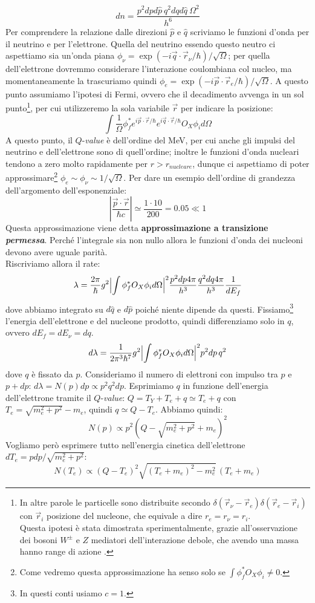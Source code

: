 $$dn = \frac{p^2 dp d\hat{p}\:q^2dqd\hat{q}\:\Omega^2}{h^6}$$
Per comprendere la relazione dalle direzioni $\hat{p}$ e $\hat{q}$ scriviamo le funzioni d'onda per il neutrino e per l'elettrone. Quella del neutrino essendo questo neutro ci aspettiamo sia un'onda piana $\phi_\nu = \exp{(-i\vec{q}\cdot\vec{r}_\nu/\hbar)}/\sqrt{\Omega}$; per quella dell'elettrone dovremmo considerare l'interazione coulombiana col nucleo, ma momentaneamente la trascuriamo quindi $\phi_e = \exp{(-i\vec{p}\cdot\vec{r}_e/\hbar)}/\sqrt{\Omega}$. A questo punto assumiamo l'ipotesi di Fermi, ovvero che il decadimento avvenga in un sol punto\footnote{In altre parole le particelle sono distribuite secondo $\delta(\vec{r}_\nu - \vec{r}_e)\delta(\vec{r}_e-\vec{r}_i)$ con $\vec{r}_i$ posizione del nucleone, che equivale a dire $r_e=r_\nu=r_i$.\\ 
Questa ipotesi è stata dimostrata sperimentalmente, grazie all'osservazione dei bosoni $W^\pm$ e $Z$ mediatori dell'interazione debole, che avendo una massa  hanno range di azione .}, per cui utilizzeremo la sola variabile $\vec{r}$ per indicare la posizione: 
$$\int \frac{1}{\Omega} \phi^*_f e^{i\vec{p}\cdot\vec{r}/\hbar} e^{i\vec{q}\cdot\vec{r}/\hbar} O_X \phi_i d\Omega$$
A questo punto, il $Q$-\textit{value} è dell'ordine del MeV, per cui anche gli impulsi del neutrino e dell'elettrone sono di quell'ordine; inoltre le funzioni d'onda nucleari tendono a zero molto rapidamente per $r>r_{nucleare}$, dunque ci aspettiamo di poter approssimare\footnote{Come vedremo questa approssimazione ha senso solo se $\int \phi^*_f O_X \phi_i \not = 0$.} $\phi_e\sim\phi_\nu\sim 1/\sqrt{\Omega}$. Per dare un esempio dell'ordine di grandezza dell'argomento dell'esponenziale:
$$|\frac{\vec{p}\cdot\vec{r}}{\hbar c}|\simeq \frac{1\cdot10}{200}=0.05\ll 1$$
Questa approssimazione viene detta \textbf{approssimazione a transizione \textit{permessa}}. Perché l'integrale sia non nullo allora le funzioni d'onda dei nucleoni devono avere uguale parità.\\
Riscriviamo allora il rate:
$$\lambda = \frac{2\pi}{\hbar}g^2 \Bigl |\int \phi_f^* O_X \phi_i d\Omega\Bigr |^2 \frac{p^2 dp 4\pi}{h^3}\frac{q^2dq4\pi}{h^3}\frac{1}{dE_f}$$
dove abbiamo integrato su $d\hat{q}$ e $d\hat{p}$ poiché niente dipende da questi. Fissiamo\footnote{In questi conti usiamo $c=1$.} l'energia dell'elettrone e del nucleone prodotto, quindi differenziamo solo in $q$, ovvero $dE_f = dE_\nu = dq$.
$$d\lambda = \frac{1}{2\pi^3 \hbar^7}g^2 \Bigl |\int \phi_f^* O_X \phi_i d\Omega\Bigr |^2 p^2 dp\, q^2 $$
dove $q$ è fissato da $p$. Consideriamo il numero di elettroni con impulso tra $p$ e $p+dp$: $d\lambda = N(p)dp \propto p^2 q^2 dp$. Esprimiamo $q$ in funzione dell'energia dell'elettrone tramite il $Q$-\textit{value}: $Q = T_Y + T_e + q \simeq T_e + q$ con $T_e = \sqrt{m_e^2 + p^2}-m_e$, quindi $q \simeq Q-T_e$. Abbiamo quindi:
$$N(p) \propto p^2(Q-\sqrt{m_e^2 + p^2}+m_e)^2$$
Vogliamo però esprimere tutto nell'energia cinetica dell'elettrone $dT_e = pdp/\sqrt{m_e^2+p^2}$:
$$N(T_e) \propto (Q-T_e)^2 \sqrt{(T_e+m_e)^2-m_e^2}\,(T_e + m_e) $$


